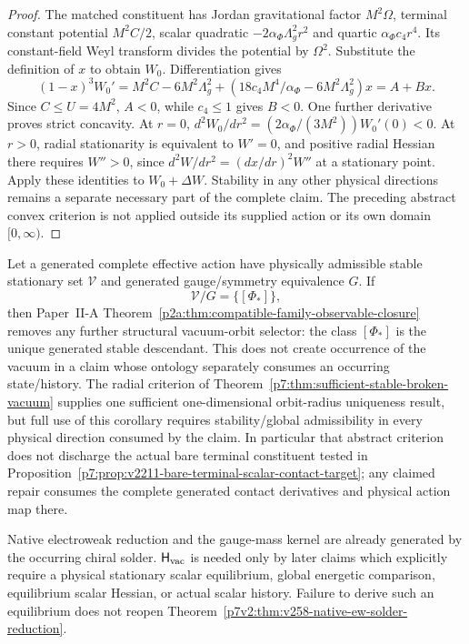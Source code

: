 \documentclass[12pt,a4paper]{article}
\newcommand{\Hvac}{\mathsf{H}_{\rm vac}}
\begin{document}
\begin{proof}
The matched constituent has Jordan gravitational factor
\(M^2\Omega\), terminal constant potential \(M^2C/2\), scalar
quadratic \(-2\alpha_\Phi\Lambda_g^2r^2\) and quartic
\(\alpha_\Phi c_4r^4\).  Its constant-field Weyl transform divides
the potential by \(\Omega^2\).  Substitute the definition of \(x\)
to obtain \(W_0\).  Differentiation gives
\[
 (1-x)^3W_0'=M^2C-6M^2\Lambda_g^2
 +(18c_4M^4/\alpha_\Phi-6M^2\Lambda_g^2)x=A+Bx.
\]
Since \(C\le U=4M^2\), \(A<0\), while \(c_4\le1\) gives
\(B<0\).  One further derivative proves strict concavity.  At
\(r=0\), \(d^2W_0/dr^2=(2\alpha_\Phi/(3M^2))W_0'(0)<0\).
At \(r>0\), radial stationarity is equivalent to \(W'=0\), and
positive radial Hessian there requires \(W''>0\), since
\(d^2W/dr^2=(dx/dr)^2W''\) at a stationary point.
Apply these identities to \(W_0+\Delta W\).  Stability in any other
physical directions remains a separate necessary part of the complete
claim.  The preceding abstract convex criterion is not applied outside
its supplied action or its own domain \([0,\infty)\).
\end{proof}

\begin{corollary}
\label{p7v2:cor:stable-vacuum-orbit-closure}
Let a generated complete effective action have physically admissible stable
stationary set $\mathcal V$ and generated gauge/symmetry equivalence $G$.  If
\[
 \mathcal V/G=\{[\Phi_*]\},
\]
then Paper~II-A
Theorem~\ref{p2a:thm:compatible-family-observable-closure} removes any further
structural vacuum-orbit selector: the class $[\Phi_*]$ is the unique generated
stable descendant.  This does not create occurrence of the vacuum in a claim
whose ontology separately consumes an occurring state/history.  The radial
criterion of Theorem~\ref{p7:thm:sufficient-stable-broken-vacuum} supplies one
sufficient one-dimensional orbit-radius uniqueness result, but full use of
this corollary requires stability/global admissibility in every physical
direction consumed by the claim.
In particular that abstract criterion does not discharge the actual bare
terminal constituent tested in
Proposition~\ref{p7:prop:v2211-bare-terminal-scalar-contact-target};
any claimed repair consumes the complete generated contact derivatives
and physical action map there.
\end{corollary}

\begin{corollary}
\label{p7v2:cor:ewsb-status}
Native electroweak reduction and the gauge-mass kernel are already generated
by the occurring chiral solder.  \(\Hvac\) is needed only by later claims
which explicitly require a physical stationary scalar equilibrium, global
energetic comparison, equilibrium scalar Hessian, or actual scalar history.
Failure to derive such an equilibrium does not reopen
Theorem~\ref{p7v2:thm:v258-native-ew-solder-reduction}.
\end{corollary}
\end{document}
